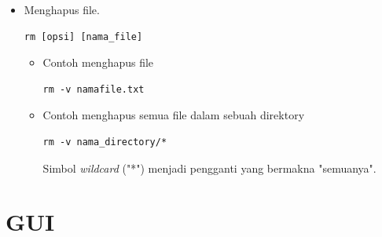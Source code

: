 \documentclass[12pt,]{article}
\begin{document}
\begin{itemize}
		\item Menghapus file.
		\begin{verbatim}
rm [opsi] [nama_file]
		\end{verbatim}
		\begin{itemize}
			\item Contoh menghapus file
			\begin{verbatim}
rm -v namafile.txt
			\end{verbatim}
			
			\item Contoh menghapus semua file dalam sebuah direktory
			\begin{verbatim}
rm -v nama_directory/*
			\end{verbatim}
			Simbol \textit{wildcard} ("*") menjadi pengganti yang bermakna "semuanya".
		\end{itemize}
	\end{itemize}
	
	\newpage
	\section{GUI}
\end{document}
